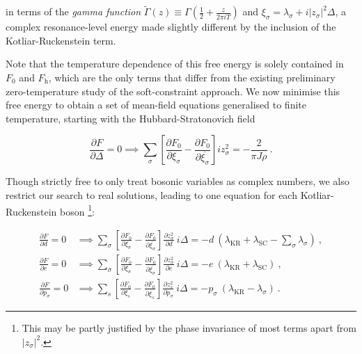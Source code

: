 \documentclass[12pt]{article}
\begin{document}
in terms of the \textit{gamma function} $ \widetilde{\Gamma} (z) \equiv \Gamma (\frac{1}{2} + \frac{z}{2 \pi i T}) $ and $ \xi_{\sigma} = \lambda_{\sigma} + i |z_{\sigma}|^2 \Delta $, a complex resonance-level energy made slightly different by the inclusion of the Kotliar-Ruckenstein term.


Note that the temperature dependence of this free energy is solely contained in $ F_0 $ and $ F_{\text{h}} $, which are the only terms that differ from the existing preliminary zero-temperature study of the soft-constraint approach. We now minimise this free energy to obtain a set of mean-field equations generalised to finite temperature, starting with the Hubbard-Stratonovich field

\begin{equation}
\frac{\partial F}{\partial \Delta} = 0 \implies \sum_{\sigma} \left[ \frac{\partial F_{0}}{\partial \xi_{\sigma}} - \frac{\partial F_{0}}{\partial \overline{\xi_{\sigma}}} \right] i z^2_{\sigma} = - \frac{2}{\pi J \rho} ~ .
\end{equation}

Though strictly free to only treat bosonic variables as complex numbers, we also restrict our search to real solutions, leading to one equation for each Kotliar-Ruckenstein boson \footnote{This may be partly justified by the phase invariance of most terms apart from $ | z_{\sigma} |^2 $.}: %

\begin{align}
\frac{\partial F}{\partial d} = 0 &\implies \sum_{\sigma} \left[ \frac{\partial F_{0}}{\partial \xi_{\sigma}} - \frac{\partial F_{0}}{\partial \overline{\xi_{\sigma}}} \right] \frac{\partial z^2_{\sigma}}{\partial d} ~ i \Delta = -d ~ ( \lambda_{\text{KR}} + \lambda_{\text{SC}} -  \sum_{\sigma} \lambda_{\sigma} ) ~ , \label{eq:MF_d} \\
\frac{\partial F}{\partial e} = 0 &\implies \sum_{\sigma} \left[ \frac{\partial F_{0}}{\partial \xi_{\sigma}} - \frac{\partial F_{0}}{\partial \overline{\xi_{\sigma}}} \right] \frac{\partial z^2_{\sigma}}{\partial e} ~ i \Delta = -e ~ ( \lambda_{\text{KR}} + \lambda_{\text{SC}} ) ~ , \label{eq:MF_e} \\
\frac{\partial F}{\partial p_{\sigma}} = 0 &\implies \sum_{s} \left[ \frac{\partial F_{0}}{\partial \xi_{s}} - \frac{\partial F_{0}}{\partial \overline{\xi_{s}}} \right] \frac{\partial z^2_{s}}{\partial p_{\sigma}} ~ i \Delta = - p_{\sigma} ~ (\lambda_{\text{KR}} - \lambda_{\sigma}) ~ . \label{eq:MF_p}
\end{align}
\end{document}
